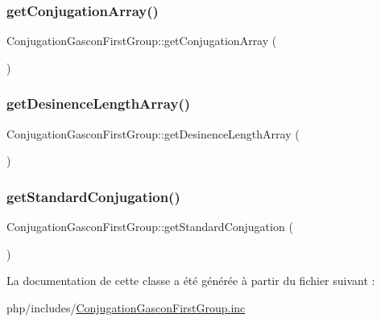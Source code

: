 \subsubsection{\texorpdfstring{get\+Conjugation\+Array()}{getConjugationArray()}}
{\footnotesize\ttfamily Conjugation\+Gascon\+First\+Group\+::get\+Conjugation\+Array (\begin{DoxyParamCaption}{ }\end{DoxyParamCaption})\hspace{0.3cm}{\ttfamily [protected]}}

\hypertarget{class_conjugation_gascon_first_group_a03a995eb9d13945f5746bf20d45c4d7f}{}\label{class_conjugation_gascon_first_group_a03a995eb9d13945f5746bf20d45c4d7f} 
\subsubsection{\texorpdfstring{get\+Desinence\+Length\+Array()}{getDesinenceLengthArray()}}
{\footnotesize\ttfamily Conjugation\+Gascon\+First\+Group\+::get\+Desinence\+Length\+Array (\begin{DoxyParamCaption}{ }\end{DoxyParamCaption})\hspace{0.3cm}{\ttfamily [protected]}}

\hypertarget{class_conjugation_gascon_first_group_a60ac1ed66054150563ec6f8812861c4a}{}\label{class_conjugation_gascon_first_group_a60ac1ed66054150563ec6f8812861c4a} 
\subsubsection{\texorpdfstring{get\+Standard\+Conjugation()}{getStandardConjugation()}}
{\footnotesize\ttfamily Conjugation\+Gascon\+First\+Group\+::get\+Standard\+Conjugation (\begin{DoxyParamCaption}{ }\end{DoxyParamCaption})\hspace{0.3cm}{\ttfamily [protected]}}



La documentation de cette classe a été générée à partir du fichier suivant \+:\begin{DoxyCompactItemize}
\item 
php/includes/\hyperlink{_conjugation_gascon_first_group_8inc}{Conjugation\+Gascon\+First\+Group.\+inc}\end{DoxyCompactItemize}
